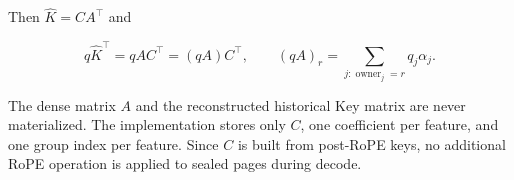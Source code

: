 \documentclass{article} %
\begin{document}
Then $\widehat K=CA^{\top}$ and

\begin{equation}
    q\widehat K^{\top}=qAC^{\top}=(qA)C^{\top},
    \qquad
    (qA)_r=\sum_{j:\operatorname{owner}_j=r}q_j\alpha_j.
    \label{eq:app-direct-attention}
\end{equation}

The dense matrix $A$ and the reconstructed historical Key matrix are never
materialized. The implementation stores only $C$, one coefficient per
feature, and one group index per feature. Since $C$ is built from post-RoPE
keys, no additional RoPE operation is applied to sealed pages during decode.
\end{document}

